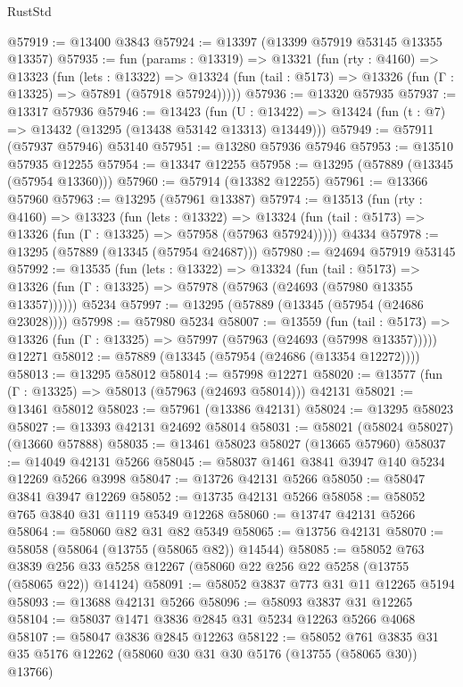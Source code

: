 \begin{lexlean}{RustStd}
\begin{coremodule}
@57919 := @13400 @3843
@57924 := @13397 (@13399 @57919 @53145 @13355 @13357)
@57935 := fun (params : @13319) =>
  @13321
    (fun (rty : @4160) =>
    @13323
      (fun (lets : @13322) =>
      @13324 (fun (tail : @5173) => @13326 (fun (Γ : @13325) => @57891 (@57918 @57924)))))
@57936 := @13320 @57935
@57937 := @13317 @57936
@57946 := @13423
    (fun (U : @13422) => @13424 (fun (t : @7) => @13432 (@13295 (@13438 @53142 @13313) @13449)))
@57949 := @57911 (@57937 @57946) @53140
@57951 := @13280 @57936 @57946
@57953 := @13510 @57935 @12255
@57954 := @13347 @12255
@57958 := @13295 (@57889 (@13345 (@57954 @13360)))
@57960 := @57914 (@13382 @12255)
@57961 := @13366 @57960
@57963 := @13295 (@57961 @13387)
@57974 := @13513
    (fun (rty : @4160) =>
    @13323
      (fun (lets : @13322) =>
      @13324 (fun (tail : @5173) => @13326 (fun (Γ : @13325) => @57958 (@57963 @57924)))))
    @4334
@57978 := @13295 (@57889 (@13345 (@57954 @24687)))
@57980 := @24694 @57919 @53145
@57992 := @13535
    (fun (lets : @13322) =>
    @13324
      (fun (tail : @5173) =>
      @13326 (fun (Γ : @13325) => @57978 (@57963 (@24693 (@57980 @13355 @13357))))))
    @5234
@57997 := @13295 (@57889 (@13345 (@57954 (@24686 @23028))))
@57998 := @57980 @5234
@58007 := @13559
    (fun (tail : @5173) => @13326 (fun (Γ : @13325) => @57997 (@57963 (@24693 (@57998 @13357)))))
    @12271
@58012 := @57889 (@13345 (@57954 (@24686 (@13354 @12272))))
@58013 := @13295 @58012
@58014 := @57998 @12271
@58020 := @13577 (fun (Γ : @13325) => @58013 (@57963 (@24693 @58014))) @42131
@58021 := @13461 @58012
@58023 := @57961 (@13386 @42131)
@58024 := @13295 @58023
@58027 := @13393 @42131 @24692 @58014
@58031 := @58021 (@58024 @58027) (@13660 @57888)
@58035 := @13461 @58023 @58027 (@13665 @57960)
@58037 := @14049 @42131 @5266
@58045 := @58037 @1461 @3841 @3947 @140 @5234 @12269 @5266 @3998
@58047 := @13726 @42131 @5266
@58050 := @58047 @3841 @3947 @12269
@58052 := @13735 @42131 @5266
@58058 := @58052 @765 @3840 @31 @1119 @5349 @12268
@58060 := @13747 @42131 @5266
@58064 := @58060 @82 @31 @82 @5349
@58065 := @13756 @42131
@58070 := @58058 (@58064 (@13755 (@58065 @82)) @14544)
@58085 := @58052
    @763
    @3839
    @256
    @33
    @5258
    @12267
    (@58060 @22 @256 @22 @5258 (@13755 (@58065 @22)) @14124)
@58091 := @58052 @3837 @773 @31 @11 @12265 @5194
@58093 := @13688 @42131 @5266
@58096 := @58093 @3837 @31 @12265
@58104 := @58037 @1471 @3836 @2845 @31 @5234 @12263 @5266 @4068
@58107 := @58047 @3836 @2845 @12263
@58122 := @58052
    @761
    @3835
    @31
    @35
    @5176
    @12262
    (@58060 @30 @31 @30 @5176 (@13755 (@58065 @30)) @13766)

\end{coremodule}
\end{lexlean}
